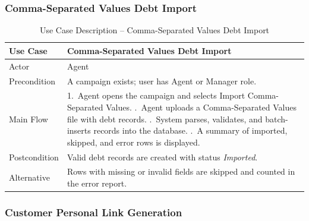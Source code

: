 \documentclass[12pt,a4paper]{report}
\newcommand{\reporttablesetup}{%
  \small%
  \setlength{\tabcolsep}{5pt}%
  \renewcommand{\arraystretch}{1.38}%
  \arrayrulecolor{framegray}%
}
\begin{document}
\subsubsection{Comma-Separated Values Debt Import}

\begin{table}[H]
  \centering
  \renewcommand{\arraystretch}{1.3}
  \reporttablesetup
  \begin{tabularx}{\textwidth}{|p{3.1cm}|Y|}
    \hline
    Use Case      & Comma-Separated Values Debt Import \\
    \hline
    Actor         & Agent \\
    \hline
    Precondition  & A campaign exists; user has Agent or Manager role. \\
    \hline
    Main Flow     & 1.\ Agent opens the campaign and selects Import Comma-Separated Values. .\ Agent uploads a Comma-Separated Values file with debt records. .\ System parses, validates, and batch-inserts records into the database. .\ A summary of imported, skipped, and error rows is displayed. \\
    \hline
    Postcondition & Valid debt records are created with status \textit{Imported}. \\
    \hline
    Alternative   & Rows with missing or invalid fields are skipped and counted in the error report. \\
    \hline
  \end{tabularx}
  \caption{Use Case Description -- Comma-Separated Values Debt Import}
  \label{tab:uc05}
\end{table}

\subsubsection{Customer Personal Link Generation}
\end{document}
